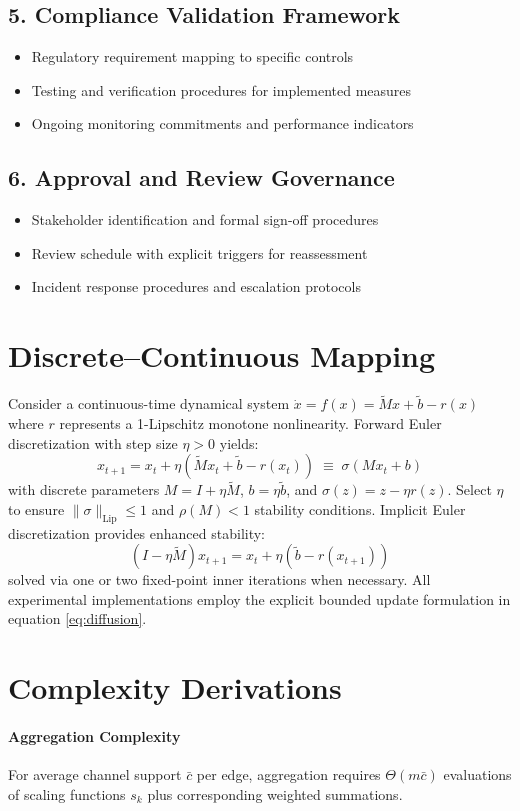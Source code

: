 \documentclass[12pt]{article}
\theoremstyle{plain}
\begin{document}
\subsection*{5. Compliance Validation Framework}
\begin{itemize}\itemsep0.2em
  \item Regulatory requirement mapping to specific controls
  \item Testing and verification procedures for implemented measures
  \item Ongoing monitoring commitments and performance indicators
\end{itemize}
\subsection*{6. Approval and Review Governance}
\begin{itemize}\itemsep0.2em
  \item Stakeholder identification and formal sign-off procedures
  \item Review schedule with explicit triggers for reassessment
  \item Incident response procedures and escalation protocols
\end{itemize}

\section{Discrete–Continuous Mapping}
\label{app:ode-mapping}
Consider a continuous-time dynamical system $\dot{x}=f(x)=\tilde{M}x+\tilde{b}-r(x)$ where $r$ represents a 1-Lipschitz monotone nonlinearity. Forward Euler discretization with step size $\eta>0$ yields:
\[
x_{t+1}=x_t+\eta(\tilde{M}x_t+\tilde{b}-r(x_t)) \;\equiv\; \sigma(Mx_t+b)
\]
with discrete parameters $M=I+\eta\tilde{M}$, $b=\eta\tilde{b}$, and $\sigma(z)=z-\eta r(z)$. Select $\eta$ to ensure $\|\sigma\|_{\text{Lip}}\le 1$ and $\rho(M)<1$ stability conditions. Implicit Euler discretization provides enhanced stability:
\[
(I-\eta \tilde{M})x_{t+1}=x_t+\eta(\tilde{b}-r(x_{t+1}))
\]
solved via one or two fixed-point inner iterations when necessary. All experimental implementations employ the explicit bounded update formulation in equation \eqref{eq:diffusion}.

\section{Complexity Derivations}
\label{app:complexity}
\paragraph{Aggregation Complexity}
For average channel support $\bar{c}$ per edge, aggregation requires $\Theta(m\bar{c})$ evaluations of scaling functions $s_k$ plus corresponding weighted summations.
\end{document}

